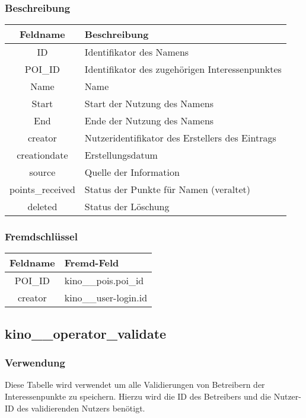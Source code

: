 \subsubsection{Beschreibung}
\begin{table}[H]
	\begin{tabular}{|c|p{12cm}|}
		\hline
		\textbf{Feldname} & \textbf{Beschreibung} \\ \hline
		ID & Identifikator des Namens \\ \hline
		POI\_ID & Identifikator des zugehörigen Interessenpunktes \\ \hline
		Name & Name \\ \hline
		Start & Start der Nutzung des Namens \\ \hline
		End & Ende der Nutzung des Namens \\ \hline
		creator & Nutzeridentifikator des Erstellers des Eintrags \\ \hline
		creationdate & Erstellungsdatum \\ \hline
		source & Quelle der Information \\ \hline
		points\_received & Status der Punkte für Namen (veraltet) \\ \hline
		deleted & Status der Löschung \\ \hline
	\end{tabular}
\end{table}
\subsubsection{Fremdschlüssel}
\begin{table}[H]
	\begin{tabular}{|c|p{12.5cm}|}
		\hline
		\textbf{Feldname} & \textbf{Fremd-Feld} \\ \hline
		POI\_ID & kino\_\_pois.poi\_id \\ \hline
		creator & kino\_\_user-login.id \\ \hline
	\end{tabular}
\end{table}
\subsection{kino\_\_operator\_validate}
\subsubsection{Verwendung} Diese Tabelle wird verwendet um alle Validierungen von Betreibern der Interessenpunkte zu speichern. Hierzu wird die ID des Betreibers und die Nutzer-ID des validierenden Nutzers benötigt.
